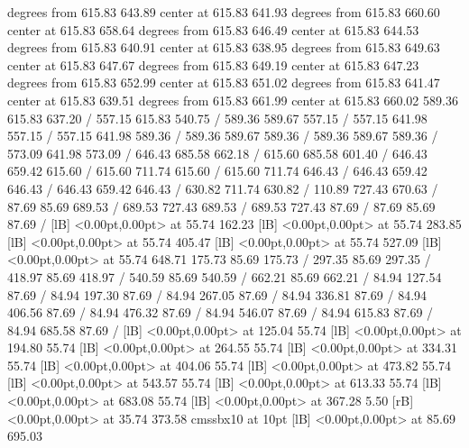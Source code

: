 { degrees from 615.83 643.89 center at 615.83 641.93
 degrees from 615.83 660.60 center at 615.83 658.64
 degrees from 615.83 646.49 center at 615.83 644.53
 degrees from 615.83 640.91 center at 615.83 638.95
 degrees from 615.83 649.63 center at 615.83 647.67
 degrees from 615.83 649.19 center at 615.83 647.23
 degrees from 615.83 652.99 center at 615.83 651.02
 degrees from 615.83 641.47 center at 615.83 639.51
 degrees from 615.83 661.99 center at 615.83 660.02
\setsolid
{} 589.36 615.83 637.20 /
\setsolid
{} 557.15 615.83 540.75 /
\setsolid
{} 589.36 589.67 557.15 /
 557.15 641.98 557.15 /
 557.15 641.98 589.36 /
 589.36 589.67 589.36 /
 589.36 589.67 589.36 /
\setsolid
{} 573.09 641.98 573.09 /
\setsolid
{} 646.43 685.58 662.18 /
\setsolid
{} 615.60 685.58 601.40 /
\setsolid
{} 646.43 659.42 615.60 /
 615.60 711.74 615.60 /
 615.60 711.74 646.43 /
 646.43 659.42 646.43 /
 646.43 659.42 646.43 /
\setsolid
{} 630.82 711.74 630.82 /
\setsolid
{} 110.89 727.43 670.63 /
\setsolid
{} 87.69 85.69 689.53 /
 689.53 727.43 689.53 /
 689.53 727.43 87.69 /
 87.69 85.69 87.69 /
  [lB] <0.00pt,0.00pt> at 55.74 162.23
  [lB] <0.00pt,0.00pt> at 55.74 283.85
  [lB] <0.00pt,0.00pt> at 55.74 405.47
  [lB] <0.00pt,0.00pt> at 55.74 527.09
  [lB] <0.00pt,0.00pt> at 55.74 648.71
\setsolid
{} 175.73 85.69 175.73 /
\setsolid
{} 297.35 85.69 297.35 /
\setsolid
{} 418.97 85.69 418.97 /
\setsolid
{} 540.59 85.69 540.59 /
\setsolid
{} 662.21 85.69 662.21 /
\setsolid
{} 84.94 127.54 87.69 /
\setsolid
{} 84.94 197.30 87.69 /
\setsolid
{} 84.94 267.05 87.69 /
\setsolid
{} 84.94 336.81 87.69 /
\setsolid
{} 84.94 406.56 87.69 /
\setsolid
{} 84.94 476.32 87.69 /
\setsolid
{} 84.94 546.07 87.69 /
\setsolid
{} 84.94 615.83 87.69 /
\setsolid
{} 84.94 685.58 87.69 /
  [lB] <0.00pt,0.00pt> at 125.04 55.74
  [lB] <0.00pt,0.00pt> at 194.80 55.74
  [lB] <0.00pt,0.00pt> at 264.55 55.74
  [lB] <0.00pt,0.00pt> at 334.31 55.74
  [lB] <0.00pt,0.00pt> at 404.06 55.74
  [lB] <0.00pt,0.00pt> at 473.82 55.74
  [lB] <0.00pt,0.00pt> at 543.57 55.74
  [lB] <0.00pt,0.00pt> at 613.33 55.74
  [lB] <0.00pt,0.00pt> at 683.08 55.74
  [lB] <0.00pt,0.00pt> at 367.28 5.50
 [rB] <0.00pt,0.00pt> at 35.74 373.58
\font\picfont cmssbx10 at 10pt\picfont
{}  [lB] <0.00pt,0.00pt> at 85.69 695.03
\endpicture
}
